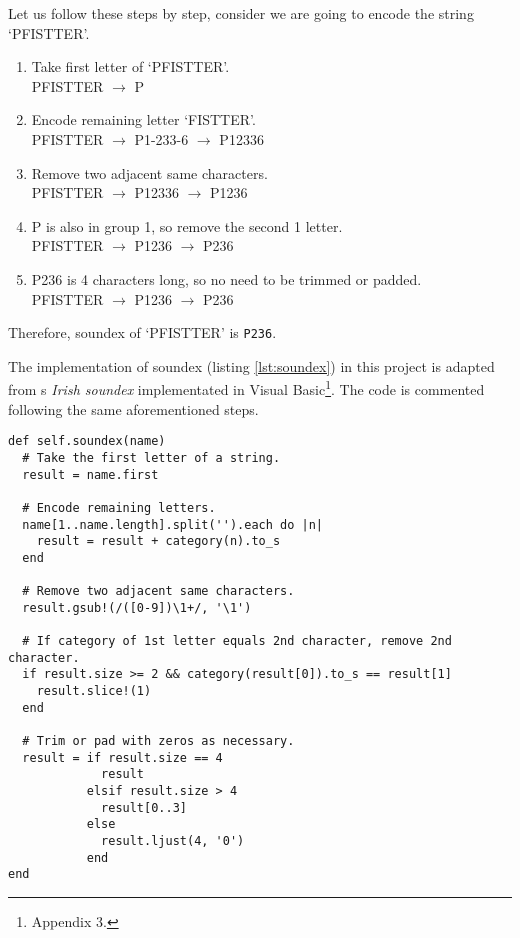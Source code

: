 Let us follow these steps by step, consider we are going to encode the string
`PFISTTER'.

\begin{enumerate}
  \item Take first letter of `PFISTTER'. \\
    PFISTTER $\rightarrow$ P
  \item Encode remaining letter `FISTTER'. \\
    PFISTTER $\rightarrow$ P1-233-6 $\rightarrow$ P12336
  \item Remove two adjacent same characters. \\
    PFISTTER $\rightarrow$ P12336 $\rightarrow$ P1236
  \item P is also in group 1, so remove the second 1 letter. \\
    PFISTTER $\rightarrow$ P1236 $\rightarrow$ P236
  \item P236 is 4 characters long, so no need to be trimmed or padded. \\
    PFISTTER $\rightarrow$ P1236 $\rightarrow$ P236
\end{enumerate}

Therefore, soundex of `PFISTTER' is \texttt{P236}.

The implementation of soundex (listing \ref{lst:soundex}) in this project is adapted from
\citeauthor{adamw}\textquotesingle s \emph{Irish soundex} implementated in Visual Basic\footnote{\cite{adamw} Appendix 3.}.
The code is commented following the same aforementioned steps.

\begin{minipage}{\linewidth}
\begin{lstlisting}[label={lst:soundex}, caption={Soundex implementation.}]
def self.soundex(name)
  # Take the first letter of a string.
  result = name.first

  # Encode remaining letters.
  name[1..name.length].split('').each do |n|
    result = result + category(n).to_s
  end

  # Remove two adjacent same characters.
  result.gsub!(/([0-9])\1+/, '\1')

  # If category of 1st letter equals 2nd character, remove 2nd character.
  if result.size >= 2 && category(result[0]).to_s == result[1]
    result.slice!(1)
  end

  # Trim or pad with zeros as necessary.
  result = if result.size == 4
             result
           elsif result.size > 4
             result[0..3]
           else
             result.ljust(4, '0')
           end
end
\end{lstlisting}
\end{minipage}

